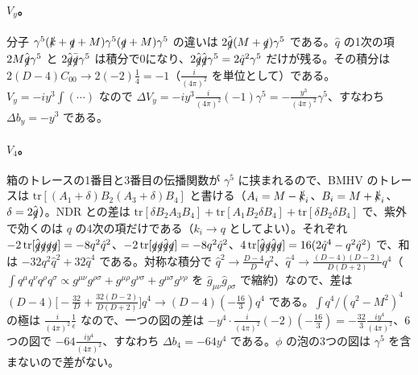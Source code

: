 \documentclass[a4paper,10pt]{ltjsarticle}
\begin{document}
\paragraph{$V_y$。}分子 $\gamma^5(\slashed k+\slashed q+M)\gamma^5(\slashed q+M)\gamma^5$ の違いは $2\hat{\slashed q}(M+\slashed q)\gamma^5$ である。$\hat q$ の1次の項 $2M\hat{\slashed q}\gamma^5$ と $2\hat{\slashed q}\bar{\slashed q}\gamma^5$ は積分で0になり、$2\hat{\slashed q}\hat{\slashed q}\gamma^5=2\hat q^2\gamma^5$ だけが残る。その積分は $2(D-4)C_{00}\to2(-2)\frac14=-1$（$\frac{i}{(4\pi)^2}$ を単位として）である。$V_y=-iy^3\int(\cdots)$ なので $\Delta V_y=-iy^3\frac{i}{(4\pi)^2}(-1)\gamma^5=-\frac{y^3}{(4\pi)^2}\gamma^5$、すなわち $\Delta b_y=-y^3$ である。

\paragraph{$V_4$。}箱のトレースの1番目と3番目の伝播関数が $\gamma^5$ に挟まれるので、BMHV のトレースは $\mathrm{tr}[(A_1+\delta)B_2(A_3+\delta)B_4]$ と書ける（$A_i=M-\slashed k_i$、$B_i=M+\slashed k_i$、$\delta=2\hat{\slashed q}$）。NDR との差は $\mathrm{tr}[\delta B_2A_3B_4]+\mathrm{tr}[A_1B_2\delta B_4]+\mathrm{tr}[\delta B_2\delta B_4]$ で、紫外で効くのは $q$ の4次の項だけである（$k_i\to q$ としてよい）。それぞれ $-2\,\mathrm{tr}[\hat{\slashed q}\slashed q\slashed q\slashed q]=-8q^2\hat q^2$、$-2\,\mathrm{tr}[\slashed q\slashed q\hat{\slashed q}\slashed q]=-8q^2\hat q^2$、$4\,\mathrm{tr}[\hat{\slashed q}\slashed q\hat{\slashed q}\slashed q]=16(2\hat q^4-q^2\hat q^2)$ で、和は $-32q^2\hat q^2+32\hat q^4$ である。対称な積分で $\hat q^2\to\frac{D-4}{D}q^2$、$\hat q^4\to\frac{(D-4)(D-2)}{D(D+2)}q^4$（$\int q^\mu q^\nu q^\rho q^\sigma\propto g^{\mu\nu}g^{\rho\sigma}+g^{\mu\rho}g^{\nu\sigma}+g^{\mu\sigma}g^{\nu\rho}$ を $\hat g_{\mu\nu}\hat g_{\rho\sigma}$ で縮約）なので、差は $(D-4)\bigl[-\frac{32}{D}+\frac{32(D-2)}{D(D+2)}\bigr]q^4\to(D-4)(-\frac{16}{3})q^4$ である。$\int q^4/(q^2-M^2)^4$ の極は $\frac{i}{(4\pi)^2}\frac1\epsilon$ なので、一つの図の差は $-y^4\cdot\frac{i}{(4\pi)^2}(-2)(-\frac{16}{3})=-\frac{32}{3}\frac{iy^4}{(4\pi)^2}$、6つの図で $-64\frac{iy^4}{(4\pi)^2}$、すなわち $\Delta b_4=-64y^4$ である。$\phi$ の泡の3つの図は $\gamma^5$ を含まないので差がない。
\end{document}
